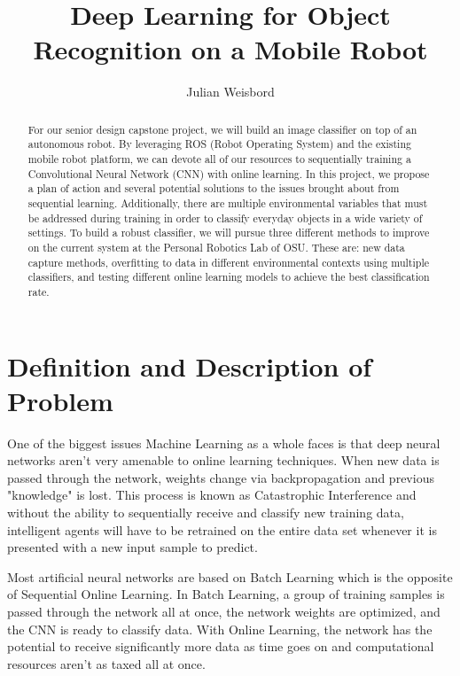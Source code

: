 \documentclass[a4paper, 10pt]{article}
\title{Deep Learning for Object Recognition on a Mobile Robot}
\author{Julian Weisbord}
\begin{document}
\maketitle

\begin{abstract}
\newline
For our senior design capstone project, we will build an image classifier on top of an autonomous robot. By leveraging ROS (Robot Operating System)  and the existing mobile robot platform, we can devote all of our resources to sequentially training a Convolutional Neural Network (CNN) with online learning. In this project, we propose a plan of action and several potential solutions to the issues brought about from sequential learning. Additionally, there are multiple environmental variables that must be addressed during training in order to classify everyday objects in a wide variety of settings. To build a robust classifier, we will pursue three different methods to improve on the current system at the Personal Robotics Lab of OSU. These are: new data capture methods, overfitting to data in different environmental contexts using multiple classifiers, and testing different online learning models to achieve the best classification rate.
\end{abstract}

\newpage

\section{Definition and Description of Problem}

One of the biggest issues Machine Learning as a whole faces is that deep neural networks aren't very amenable to online learning techniques. When new data is passed through the network, weights change via backpropagation and previous "knowledge" is lost. This process is known as Catastrophic Interference and without the ability to sequentially receive and classify new training data, intelligent agents will have to be retrained on the entire data set whenever it is presented with a new input sample to predict. 
	
Most artificial neural networks are based on Batch Learning which is the opposite of Sequential Online Learning. In Batch Learning, a group of training samples is passed through the network all at once, the network weights are optimized, and the CNN is ready to classify data. With Online Learning,  the network has the potential to receive significantly more data as time goes on and computational resources aren't as taxed all at once.
	
\end{document}

